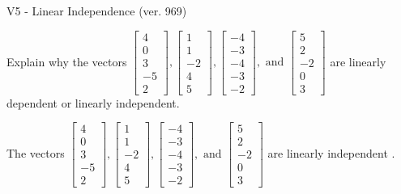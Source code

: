 \begin{exercise}
  \begin{exerciseTitle}V5 - Linear Independence (ver. 969)\end{exerciseTitle}
  \begin{exerciseStatement}
    Explain why the vectors \(\left[\begin{array}{r}
4 \\
0 \\
3 \\
-5 \\
2
\end{array}\right] , \left[\begin{array}{r}
1 \\
1 \\
-2 \\
4 \\
5
\end{array}\right] , \left[\begin{array}{r}
-4 \\
-3 \\
-4 \\
-3 \\
-2
\end{array}\right] , \text{ and } \left[\begin{array}{r}
5 \\
2 \\
-2 \\
0 \\
3
\end{array}\right]\) are linearly dependent or linearly independent.	


  \end{exerciseStatement}
  \begin{exerciseAnswer}
   The vectors \(\left[\begin{array}{r}
4 \\
0 \\
3 \\
-5 \\
2
\end{array}\right] , \left[\begin{array}{r}
1 \\
1 \\
-2 \\
4 \\
5
\end{array}\right] , \left[\begin{array}{r}
-4 \\
-3 \\
-4 \\
-3 \\
-2
\end{array}\right] , \text{ and } \left[\begin{array}{r}
5 \\
2 \\
-2 \\
0 \\
3
\end{array}\right]\) are 
  	 linearly independent  .
  


  \end{exerciseAnswer}
\end{exercise}